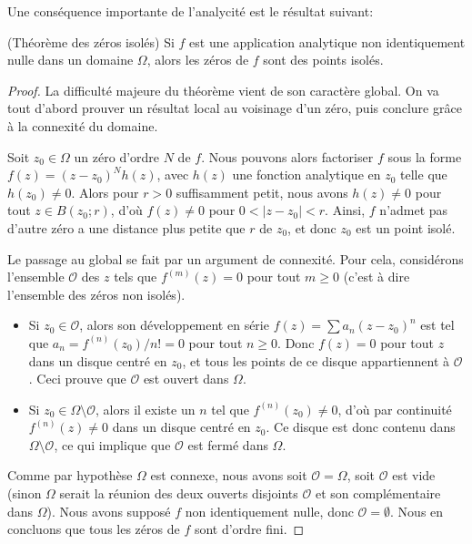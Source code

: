 Une conséquence importante de l'analycité est le résultat suivant:
\begin{fthm}(Théorème des zéros isolés)
Si $f$ est une application analytique non identiquement nulle dans un domaine
$\Omega$, alors les zéros de $f$ sont des points isolés.
\end{fthm}
\begin{proof}
La difficulté majeure du théorème vient de son caractère global. On va tout
d'abord prouver un résultat local au voisinage d'un zéro, puis conclure grâce à la connexité du domaine. 

Soit $z_0 \in \Omega$ un zéro d'ordre $N$ de $f$. Nous pouvons alors factoriser $f$ sous la forme $f(z)=(z-z_0)^N h(z)$, avec $h(z)$ une fonction analytique en $z_0$ telle que $h(z_0) \neq 0$. Alors pour $r>0$ suffisamment petit, nous avons $h(z) \neq 0$ pour tout $z \in B(z_0 ;r)$, d'où $f(z) \neq 0$ pour $0 < \lvert z-z_0 \rvert <r$. Ainsi, $f$ n'admet pas d'autre zéro a une distance plus petite que $r$ de $z_0$, et donc $z_0$ est un point isolé.

Le passage au global se fait par un argument de connexité. Pour cela, considérons l'ensemble $\mathcal{O}$ des $z$ tels que $f^{(m)}(z)=0$ pour tout $m \geq 0$ (c'est à dire l'ensemble des zéros non isolés).
\begin{itemize}
    \item[$\bullet$] Si $z_0 \in \mathcal{O}$, alors son développement en série $f(z)=\sum a_n (z-z_0)^n$ est tel que $a_n=f^{(n)}(z_0)/n!=0$ pour tout $n \geq 0$. Donc $f(z)=0$ pour tout $z$ dans un disque centré en $z_0$, et tous les points de ce disque appartiennent à $\mathcal{O}$. Ceci prouve que $\mathcal{O}$ est ouvert dans $\Omega$.
    \item[$\bullet$] Si $z_0 \in \Omega \setminus \mathcal{O}$, alors il existe un $n$ tel que $f^{(n)}(z_0) \neq 0$, d'où par continuité $f^{(n)}(z) \neq 0$ dans un disque centré en $z_0$. Ce disque est donc contenu dans $\Omega \setminus \mathcal{O}$, ce qui implique que $\mathcal{O}$ est fermé dans $\Omega$.
\end{itemize}
Comme par hypothèse $\Omega$ est connexe, nous avons soit $\mathcal{O}=\Omega$, soit $\mathcal{O}$ est vide (sinon $\Omega$ serait la réunion des deux ouverts disjoints $\mathcal{O}$ et son complémentaire dans $\Omega$). Nous avons supposé $f$ non identiquement nulle, donc $\mathcal{O}=\emptyset$. Nous en concluons que tous les zéros de $f$ sont d'ordre fini.
\end{proof}

